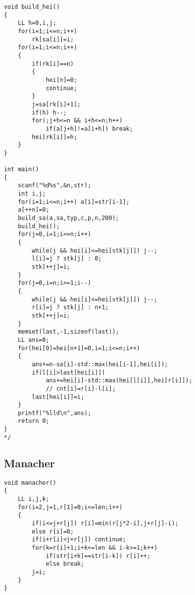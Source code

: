 \documentclass[a4paper,12pt]{article}
\begin{document}
\begin{lstlisting}
void build_hei()
{
    LL h=0,i,j;
    for(i=1;i<=n;i++)
        rk[sa[i]]=i;
    for(i=1;i<=n;i++)
    {
        if(rk[i]==n)
        {
            hei[n]=0;
            continue;
        }
        j=sa[rk[i]+1];
        if(h) h--;
        for(;j+h<=n && i+h<=n;h++)
            if(a[j+h]!=a[i+h]) break;
        hei[rk[i]]=h;
    }
}

int main()
{
    scanf("%d%s",&n,str);
    int i,j;
    for(i=1;i<=n;i++) a[i]=str[i-1];
    a[++n]=0;
    build_sa(a,sa,typ,c,p,n,200);
    build_hei();
    for(j=0,i=1;i<=n;i++)
    {
        while(j && hei[i]<=hei[stk[j]]) j--;
        l[i]=j ? stk[j] : 0;
        stk[++j]=i;
    }
    for(j=0,i=n;i>=1;i--)
    {
        while(j && hei[i]<=hei[stk[j]]) j--;
        r[i]=j ? stk[j] : n+1;
        stk[++j]=i;
    }
    memset(last,-1,sizeof(last));
    LL ans=0;
    for(hei[0]=hei[n+1]=0,i=1;i<=n;i++)
    {
        ans+=n-sa[i]-std::max(hei[i-1],hei[i]);
        if(l[i]>last[hei[i]])
            ans+=hei[i]-std::max(hei[l[i]],hei[r[i]]);
            // cnt[i]=r[i]-l[i];
        last[hei[i]]=i;
    }
    printf("%lld\n",ans);
    return 0;
}
*/
\end{lstlisting}

\subsection{Manacher}
\begin{lstlisting}
void manacher()
{
    LL i,j,k;
    for(i=2,j=1,r[1]=0;i<=len;i++)
    {
        if(i<=j+r[j]) r[i]=min(r[j*2-i],j+r[j]-i);
        else r[i]=0;
        if(i+r[i]<j+r[j]) continue;
        for(k=r[i]+1;i+k<=len && i-k>=1;k++)
            if(str[i+k]==str[i-k]) r[i]++;
            else break;
        j=i;
    }
}
\end{lstlisting}
\end{document}
